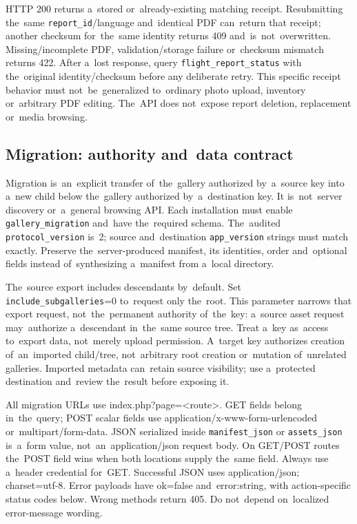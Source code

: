 \documentclass[11pt,a4paper]{article}
\newcommand{\codeword}[1]{\nolinkurl{#1}}
\begin{document}
HTTP 200 returns a~stored or~already-existing matching receipt. Resubmitting the~same
\codeword{report_id}/language and~identical PDF can~return that receipt; another checksum
for~the~same identity returns 409 and~is~not~overwritten. Missing/incomplete PDF,
validation/storage failure or~checksum mismatch returns 422. After a~lost response, query
\codeword{flight_report_status} with the~original identity/checksum before any deliberate
retry. This specific receipt behavior must not~be~generalized to~ordinary photo upload,
inventory or~arbitrary PDF editing. The~API does not~expose report deletion, replacement
or~media browsing.

\subsection{\texorpdfstring{Migration: authority and~data contract}{Migration: authority and data contract}}

\label{api352:migration-contract}

Migration is~an~explicit transfer of~the~gallery authorized by~a~source key into a~new child
below the~gallery authorized by~a~destination key. It is~not~server discovery or~a~general
browsing API. Each installation must enable \codeword{gallery_migration} and~have
the~required schema. The~audited \codeword{protocol_version} is~2; source and~destination
\codeword{app_version} strings must match exactly. Preserve the~server-produced manifest,
its identities, order and~optional fields instead of~synthesizing a~manifest from a~local
directory.

The~source export includes descendants by~default. Set \codeword{include_subgalleries}=0
to~request only the~root. This parameter narrows that export request, not~the~permanent
authority of~the~key: a~source asset request may~authorize a~descendant in~the~same source
tree. Treat a~key as~access to~export data, not~merely upload permission. A~target key
authorizes creation of~an~imported child/tree, not~arbitrary root creation or~mutation
of~unrelated galleries. Imported metadata can~retain source visibility; use a~protected
destination and~review the~result before exposing it.

All migration URLs use index.php?page=<route>. GET fields belong in~the~query; POST scalar
fields use application/x-www-form-urlencoded or~multipart/form-data. JSON serialized inside
\codeword{manifest_json} or \codeword{assets_json} is~a~form value, not~an~application/json
request body. On GET/POST routes the~POST field wins when both locations supply the~same
field. Always use a~header credential for~GET. Successful JSON uses application/json;
charset=utf-8. Error payloads have ok=false and~error:string, with action-specific status
codes below. Wrong methods return 405. Do not~depend on~localized error-message wording.
\end{document}
